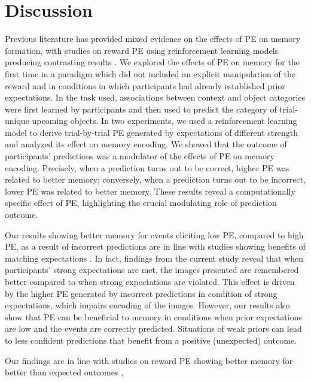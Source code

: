 \documentclass[a4paper,12pt]{article}
\begin{document}
\section{Discussion}
Previous literature has provided mixed evidence on the effects of PE on memory formation, with studies on reward PE using reinforcement learning models producing contrasting results \citep{Jang2019, de2018signed,Rouhani2018, Rouhani2021}. We explored the effects of PE on memory for the first time in a paradigm which did not included an explicit manipulation of the reward and in conditions in which participants had already established prior expectations. In the task used, associations between context and object categories were first learned by participants and then used to predict the category of trial-unique upcoming objects. In two experiments, we used a reinforcement learning model to derive trial-by-trial PE generated by expectations of different strength and analyzed its effect on memory encoding. We showed that the outcome of participants' predictions was a modulator of the effects of PE on memory encoding. Precisely, when a prediction turns out to be correct, higher PE was related to better memory; conversely, when a prediction turns out to be incorrect, lower PE was related to better memory. These results reveal a computationally specific effect of PE, highlighting the crucial modulating role of prediction outcome. \par
Our results showing better memory for events eliciting low PE, compared to high PE, as a result of incorrect predictions are in line with studies showing benefits of matching expectations \citep{Bein2015, BrodGarvinShingYee2019, VanKesteren2013}⁠. In fact, findings from the current study reveal that when participants' strong expectations are met, the images presented are remembered better compared to when strong expectations are violated. This effect is driven by the higher PE generated by incorrect predictions in condition of strong expectations, which impairs encoding of the images. However, our results also show that PE can be beneficial to memory in conditions when prior expectations are low and the events are correctly predicted. Situations of weak priors can lead to less confident predictions that benefit from a positive (unexpected) outcome. \par
Our findings are in line with studies on reward PE showing better memory for better than expected outcomes \citep{de2018signed, Jang2019},
\end{document}
